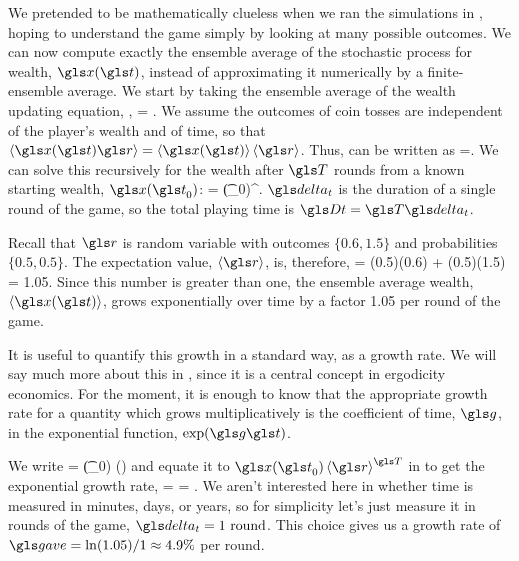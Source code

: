 We pretended to be mathematically clueless when we ran the simulations in , hoping to understand the game simply by looking at many possible outcomes. We can now compute exactly the ensemble average of the stochastic process for wealth, $\x(\t)$, instead of approximating it numerically by a finite-ensemble average. We start by taking the ensemble average of the wealth updating equation, ,
\be
\ave{\x(\t+\dt)} = \ave{\x(\t)\gr}.
\ee
We assume the outcomes of coin tosses are independent of the player's wealth and of time, so that $\ave{\x(\t)\gr} = \ave{\x(\t)}\ave{\gr}$. Thus,  can be written as
\be
\ave{\x(\t+\dt)}=\ave{\x(\t)}\ave{\gr}.
\ee
We can solve this recursively for the wealth after $\T$ rounds from a known starting wealth, $\x(\t_0)$:
\be
{} = \x(\t_0)\ave{\gr}^\T.
\ee
$\dt$ is the duration of a single round of the game, so the total playing time is $\Dt=\T\dt$.

Recall that $\gr$ is random variable with outcomes $\{0.6,1.5\}$ and probabilities $\{0.5,0.5\}$. The expectation value, $\ave{\gr}$, is, therefore,
\be
\ave{\gr} = (0.5)(0.6) + (0.5)(1.5) = 1.05.
\ee
Since this number is greater than one, the ensemble average wealth, $\ave{\x(\t)}$, grows exponentially over time by a factor 1.05 per round of the game.

It is useful to quantify this growth in a standard way, as a growth rate. We will say much more about this in , since it is a central concept in ergodicity economics. For the moment, it is enough to know that the appropriate growth rate for a quantity which grows multiplicatively is the coefficient of time, $\g$, in the exponential function, $\exp(\g\t)$.

We write
\be
{} = \x(\t_0) \exp(\ggave\Dt)
\ee
and equate it to $\x(\t_0)\ave{\gr}^\T$ in  to get the exponential growth rate,
\be
\ggave = \frac{\T\ln\ave{\gr}}{\Dt} = \frac{\ln\ave{\gr}}{\dt}.
\ee
We aren't interested here in whether time is measured in minutes, days, or years, so for simplicity let's just measure it in rounds of the game, \ie $\dt=1\text{ round}$. This choice gives us a growth rate of $\ggave = \ln(1.05)/1 \approx 4.9\%$ per round.

